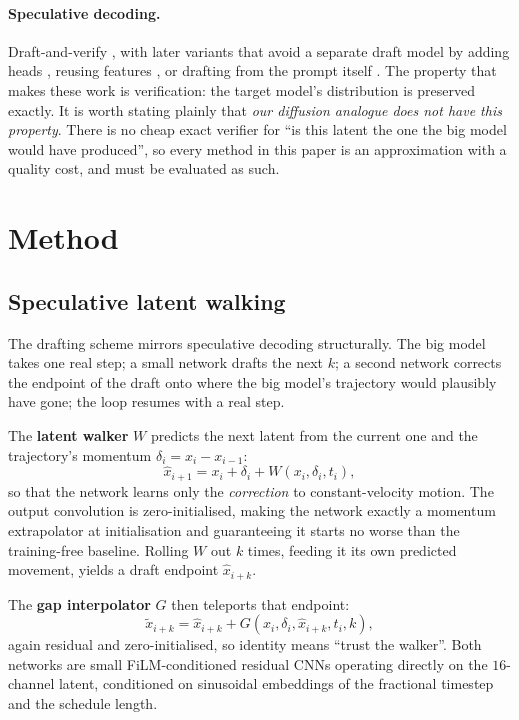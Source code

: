 \documentclass[11pt,a4paper]{article}
\begin{document}
\paragraph{Speculative decoding.}
Draft-and-verify \citep{leviathan2023speculative,chen2023accelerating}, with
later variants that avoid a separate draft model by adding heads
\citep{cai2024medusa}, reusing features \citep{li2024eagle}, or drafting from
the prompt itself \citep{saxena2023promptlookup}. The property that makes these
work is verification: the target model's distribution is preserved exactly. It
is worth stating plainly that \emph{our diffusion analogue does not have this
property}. There is no cheap exact verifier for ``is this latent the one the big
model would have produced'', so every method in this paper is an approximation
with a quality cost, and must be evaluated as such.

\section{Method}
\label{sec:method}

\subsection{Speculative latent walking}

The drafting scheme mirrors speculative decoding structurally. The big model
takes one real step; a small network drafts the next $k$; a second network
corrects the endpoint of the draft onto where the big model's trajectory would
plausibly have gone; the loop resumes with a real step.

The \textbf{latent walker} $W$ predicts the next latent from the current one and
the trajectory's momentum $\delta_i = x_i - x_{i-1}$:
\begin{equation}
  \hat{x}_{i+1} = x_i + \delta_i + W(x_i, \delta_i, t_i),
\end{equation}
so that the network learns only the \emph{correction} to constant-velocity
motion. The output convolution is zero-initialised, making the network exactly a
momentum extrapolator at initialisation and guaranteeing it starts no worse than
the training-free baseline. Rolling $W$ out $k$ times, feeding it its own
predicted movement, yields a draft endpoint $\hat{x}_{i+k}$.

The \textbf{gap interpolator} $G$ then teleports that endpoint:
\begin{equation}
  \tilde{x}_{i+k} = \hat{x}_{i+k} + G(x_i, \delta_i, \hat{x}_{i+k}, t_i, k),
\end{equation}
again residual and zero-initialised, so identity means ``trust the walker''. Both
networks are small FiLM-conditioned residual CNNs operating directly on the
$16$-channel latent, conditioned on sinusoidal embeddings of the fractional
timestep and the schedule length.
\end{document}
